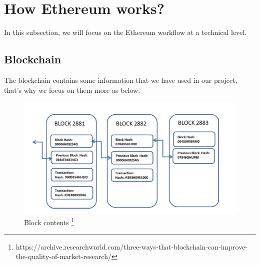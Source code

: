 \section{How Ethereum works?}
In this subsection, we will focus on the Ethereum workflow at a technical level.
\subsection{Blockchain}
The blockchain contains some information that we have used in our project, that's why we focus on them more as below:

\begin{center}
	\begin{figure}[htb!]
		
		\begin{minipage}{0.55\linewidth}
			\centering
			\includegraphics[width=1.95\textwidth]{images/chap01_Blockchain.png}
		\end{minipage}
		\caption[Block contents]{Block contents \footnote{https://archive.researchworld.com/three-ways-that-blockchain-can-improve-the-quality-of-market-research/}}
		
	\end{figure}
	
\end{center}
